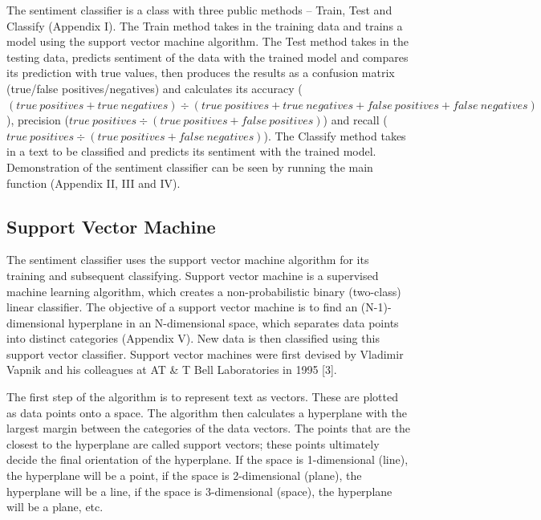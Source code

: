 \documentclass[12pt,journal,compsoc]{IEEEtran}
\begin{document}
The sentiment classifier is a class with three public methods – Train, Test and Classify (Appendix I). The Train method takes in the training data and trains a model using the support vector machine algorithm. The Test method takes in the testing data, predicts sentiment of the data with the trained model and compares its prediction with true values, then produces the results as a confusion matrix (true/false positives/negatives) and calculates its accuracy (\begin{math}(true\ positives + true\ negatives) \div (true\ positives + true\ negatives + false\ positives + false\ negatives)\end{math}), precision (\begin{math}true\ positives \div (true\ positives + false\ positives)\end{math}) and recall (\begin{math}true\ positives \div (true\ positives + false\ negatives)\end{math}). The Classify method takes in a text to be classified and predicts its sentiment with the trained model. Demonstration of the sentiment classifier can be seen by running the main function (Appendix II, III and IV).

\subsection{Support Vector Machine}
The sentiment classifier uses the support vector machine algorithm for its training and subsequent classifying.
Support vector machine is a supervised machine learning algorithm, which creates a non-probabilistic binary (two-class) linear classifier. The objective of a support vector machine is to find an (N-1)-dimensional hyperplane in an N-dimensional space, which separates data points into distinct categories (Appendix V). New data is then classified using this support vector classifier. Support vector machines were first devised by Vladimir Vapnik and his colleagues at AT \& T Bell Laboratories in 1995 [3].

The first step of the algorithm is to represent text as vectors. These are plotted as data points onto a space. The algorithm then calculates a hyperplane with the largest margin between the categories of the data vectors. The points that are the closest to the hyperplane are called support vectors; these points ultimately decide the final orientation of the hyperplane. If the space is 1-dimensional (line), the hyperplane will be a point, if the space is 2-dimensional (plane), the hyperplane will be a line, if the space is 3-dimensional (space), the hyperplane will be a plane, etc.
\end{document}
